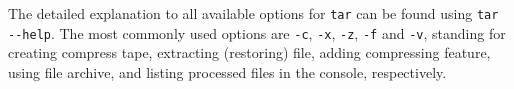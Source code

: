 The detailed explanation to all available options for \verb|tar| can be found using \verb|tar --help|. The most commonly used options are \verb|-c|, \verb|-x|, \verb|-z|, \verb|-f| and \verb|-v|, standing for creating compress tape, extracting (restoring) file, adding compressing feature, using file archive, and listing processed files in the console, respectively.















